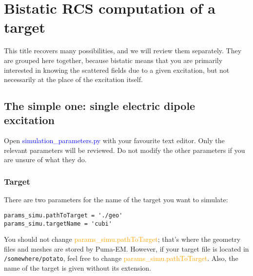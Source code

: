 \documentclass[a4paper,10pt]{book}
\newcommand{\file}[1] {\textcolor{blue}{\textsf{#1}}}
\newcommand{\parameter}[1] {\textcolor{orange}{\textsf{#1}}}
\begin{document}
\section{Bistatic RCS computation of a target}
%
\par
This title recovers many possibilities, and we will review them separately. They are grouped here together, because bistatic means that you are primarily interested in knowing the scattered fields due to a given excitation, but not necessarily at the place of the excitation itself.

\subsection{The simple one: single electric dipole excitation}
\label{subsection:The simple one: single electric dipole excitation}
%
\par
Open \file{simulation\_parameters.py} with your favourite text editor. Only the relevant parameters will be reviewed. Do not modify the other parameters if you are unsure of what they do.

\subsubsection{Target}
%
\par
There are two parameters for the name of the target you want to simulate:
\begin{verbatim}
params_simu.pathToTarget = './geo'
params_simu.targetName = 'cubi'
\end{verbatim}
You should not change \parameter{params\_simu.pathToTarget}; that's where the geometry files and meshes are stored by Puma-EM. However, if your target file is located in \texttt{/somewhere/potato}, feel free to change \parameter{params\_simu.pathToTarget}. Also, the name of the target is given without its extension.
\end{document}
